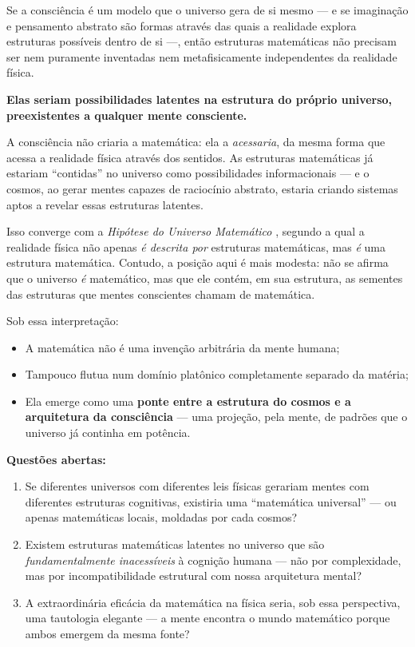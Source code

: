 \documentclass[12pt,a4paper]{article}
\begin{document}
Se a consciência é um modelo que o universo gera de si mesmo — e se
imaginação e pensamento abstrato são formas através das quais a realidade
explora estruturas possíveis dentro de si —, então estruturas matemáticas
não precisam ser nem puramente inventadas nem metafisicamente independentes
da realidade física.

\textbf{Elas seriam possibilidades latentes na estrutura do próprio universo,
preexistentes a qualquer mente consciente.}

A consciência não criaria a matemática: ela a \textit{acessaria}, da mesma
forma que acessa a realidade física através dos sentidos.
As estruturas matemáticas já estariam ``contidas'' no universo como
possibilidades informacionais — e o cosmos, ao gerar mentes capazes
de raciocínio abstrato, estaria criando sistemas aptos a revelar essas
estruturas latentes.

Isso converge com a \textit{Hipótese do Universo Matemático}
\citep{tegmark2014}, segundo a qual a realidade física não apenas
\textit{é descrita por} estruturas matemáticas, mas \textit{é} uma
estrutura matemática. Contudo, a posição aqui é mais modesta: não se
afirma que o universo \textit{é} matemático, mas que ele contém,
em sua estrutura, as sementes das estruturas que mentes conscientes
chamam de matemática.

Sob essa interpretação:

\begin{itemize}
  \item A matemática não é uma invenção arbitrária da mente humana;
  \item Tampouco flutua num domínio platônico completamente separado da matéria;
  \item Ela emerge como uma \textbf{ponte entre a estrutura do cosmos
    e a arquitetura da consciência} — uma projeção, pela mente,
    de padrões que o universo já continha em potência.
\end{itemize}

\begin{tcolorbox}[questionbox]
  \textbf{Questões abertas:}
  \begin{enumerate}
    \item Se diferentes universos com diferentes leis físicas gerariam
      mentes com diferentes estruturas cognitivas, existiria uma
      ``matemática universal'' — ou apenas matemáticas locais, moldadas
      por cada cosmos?
    \item Existem estruturas matemáticas latentes no universo que são
      \textit{fundamentalmente inacessíveis} à cognição humana —
      não por complexidade, mas por incompatibilidade estrutural com
      nossa arquitetura mental?
    \item A extraordinária eficácia da matemática na física
      \citep{wigner1960} seria, sob essa perspectiva, uma tautologia
      elegante — a mente encontra o mundo matemático porque ambos
      emergem da mesma fonte?
  \end{enumerate}
\end{tcolorbox}
\end{document}
